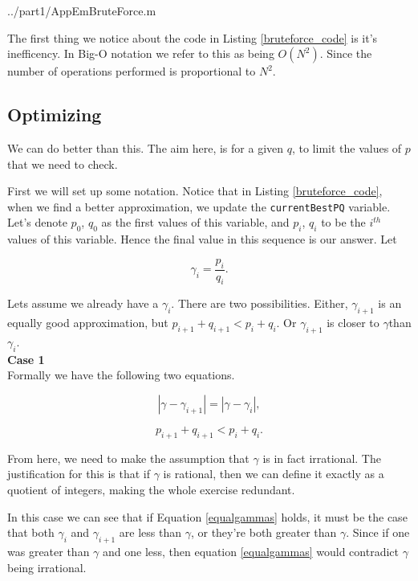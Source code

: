 \documentclass[10pt]{article}
\newcommand*{\gam}{$\gamma$}
\newcommand*{\gami}{$\gamma_{i}$}
\begin{document}
   {../part1/AppEmBruteForce.m}

The first thing we notice about the code in Listing \ref{bruteforce_code} is it's inefficency. In Big-O notation we refer to this as being $O(N^2)$. Since the number of operations performed is proportional to $N^2$.

\subsection{Optimizing}
We can do better than this. The aim here, is for a given $q$, to limit the values of $p$ that we need to check. 

First we will set up some notation. Notice that in Listing \ref{bruteforce_code}, when we find a better approximation, we update the \texttt{currentBestPQ} variable. Let's denote $p_0$, $q_0$  as the first values of this variable, and $p_i$, $q_i$ to be the $i^{th}$ values of this variable. Hence the final value in this sequence is our answer. Let

\begin{equation} \label{defgammai}
  \gamma_i = \frac{p_i}{q_i}.
\end{equation}


Lets assume we already have a \gami.  There are two possibilities. Either, $\gamma_{i+1}$ is an equally good approximation, but  $p_{i+1} + q_{i+1} < p_i + q_i$. Or $\gamma_{i+1}$ is closer to \gam than \gami. \\

\noindent \textbf{Case 1 } \\

Formally we have the following two equations.

\begin{equation}\label{equalgammas}
|\gamma- \gamma_{i+1}| = |\gamma - \gamma_{i}| ,
\end{equation}

\begin{equation} \label{contradiction}
p_{i+1} + q_{i+1} < p_i + q_i.
\end{equation}

From here, we need to make the assumption that $\gamma$ is in fact irrational. The justification for this is that if $\gamma$ is rational, then we can define it exactly as a quotient of integers, making the whole exercise redundant. 

In this case we can see that if Equation \ref{equalgammas} holds, it must be the case that both $\gamma_{i}$ and $\gamma_{i+1}$ are less than \gam, or they're both greater than $\gamma$. Since if one was greater than $\gamma$ and one less, then equation  \ref{equalgammas} would contradict $\gamma$ being irrational.
\end{document}
